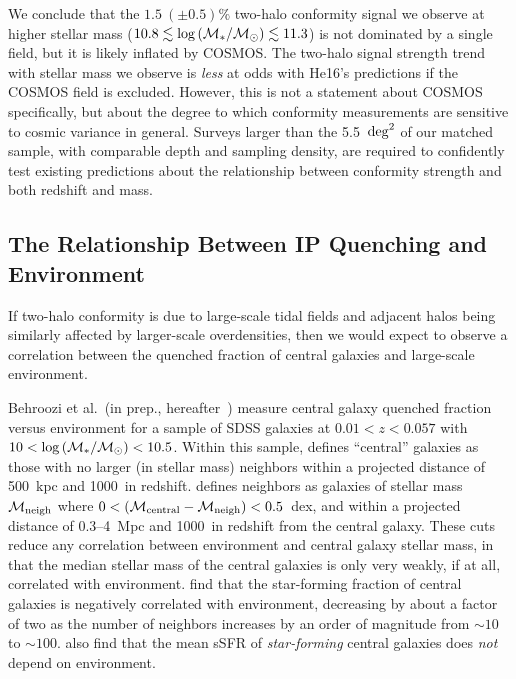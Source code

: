 We conclude that the $1.5~(\pm0.5)\%$ two-halo conformity signal we observe at higher stellar mass (${10.8\lesssim \logM
 \lesssim11.3}$) is not dominated by a single field, but it is likely inflated by COSMOS.
The two-halo signal strength trend with stellar mass we observe is \emph{less} at odds with He16's predictions if the COSMOS field is excluded.
However, this is not a statement about COSMOS specifically, but about the degree to which conformity measurements are sensitive to cosmic variance in general.
Surveys larger than the 5.5~$\degsq$ of our matched sample, with comparable depth and sampling density, are required
to confidently test existing predictions about the relationship between conformity strength and both redshift and mass.

\subsection{The Relationship Between IP Quenching and Environment}\label{sec:environment}

If two-halo conformity is due to large-scale tidal fields and adjacent halos being similarly affected by larger-scale overdensities, then we would expect to observe a correlation between the quenched fraction of central galaxies and large-scale environment.

Behroozi et al.~(in prep., hereafter~\citePB) measure central galaxy quenched fraction versus environment for a sample of SDSS galaxies at ${0.01<z<0.057}$ with ${10<\logM<10.5}$.
Within this sample, \citePB defines ``central'' galaxies as those with no larger (in stellar mass) neighbors within a projected distance of 500~kpc and 1000~\kms in redshift.
\citePB defines neighbors as galaxies of stellar mass $\mneigh$ where ${0<(\mcentral-\mneigh)<0.5}$~dex, and within a projected distance of 0.3--4~Mpc and 1000~\kms in redshift from the central galaxy.
These cuts reduce any correlation between environment and central galaxy stellar mass, in that the median stellar mass of the central galaxies is only very weakly, if at all, correlated with environment.
\citePB find that the star-forming fraction of central galaxies is negatively correlated with environment, decreasing by about a factor of two as the number of neighbors increases by an order of magnitude from $\sim10$ to $\sim100$.
\citePB also find that the mean sSFR of \emph{star-forming} central galaxies does \emph{not} depend on environment.

